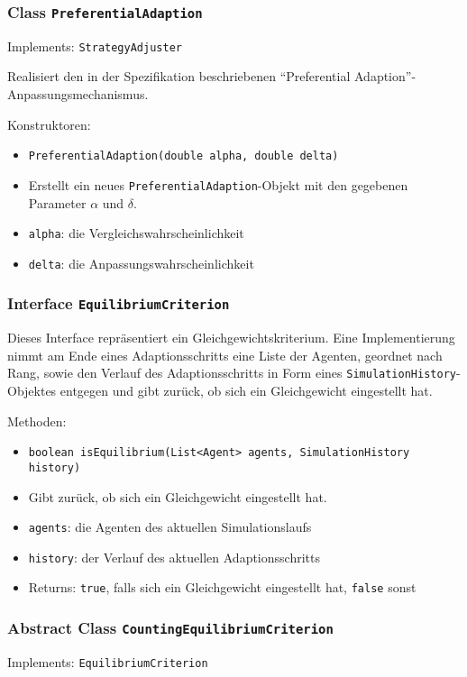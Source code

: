\documentclass[parskip=full,11pt]{scrartcl}
\begin{document}
\subsubsection{Class \texttt{PreferentialAdaption}}
Implements: \texttt{StrategyAdjuster}

Realisiert den in der Spezifikation beschriebenen \enquote{Preferential Adaption}-Anpassungsmechanismus.

Konstruktoren:
\begin{itemize}\itemsep -10pt
\item \texttt{PreferentialAdaption(double alpha, double delta)}
\item[] Erstellt ein neues \texttt{PreferentialAdaption}-Objekt mit den gegebenen Parameter \(\alpha\) und \(\delta\).
\item[] \texttt{alpha}: die Vergleichswahrscheinlichkeit
\item[] \texttt{delta}: die Anpassungswahrscheinlichkeit
\end{itemize}

\subsubsection{Interface \texttt{EquilibriumCriterion}}
Dieses Interface repräsentiert ein Gleichgewichtskriterium. Eine Implementierung nimmt am Ende eines Adaptionsschritts eine Liste der Agenten, geordnet nach Rang, sowie den Verlauf des Adaptionsschritts in Form eines \texttt{SimulationHistory}-Objektes entgegen und gibt zurück, ob sich ein Gleichgewicht eingestellt hat.

Methoden:
\begin{itemize}\itemsep -10pt
\item \texttt{boolean isEquilibrium(List<Agent> agents, SimulationHistory history)}
\item[] Gibt zurück, ob sich ein Gleichgewicht eingestellt hat.
\item[] \texttt{agents}: die Agenten des aktuellen Simulationslaufs
\item[] \texttt{history}: der Verlauf des aktuellen Adaptionsschritts
\item[] Returns: \texttt{true}, falls sich ein Gleichgewicht eingestellt hat, \texttt{false} sonst
\end{itemize}

\subsubsection{Abstract Class \texttt{CountingEquilibriumCriterion}}
Implements: \texttt{EquilibriumCriterion}
\end{document}
